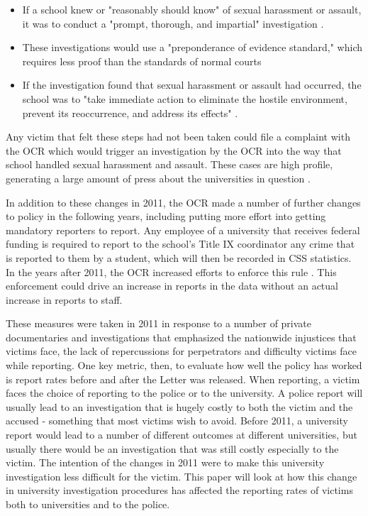 \documentclass[AER]{AEA}
\begin{document}
\begin{itemize}

\item If a school knew or "reasonably should know" of sexual harassment or assault, it was to conduct a "prompt, thorough, and impartial" investigation \cite{ali_dear_2011}.

\item These investigations would use a "preponderance of evidence standard," which requires less proof than the standards of normal courts \cite{lindo_any_2018}

\item If the investigation found that sexual harassment or assault had occurred, the school was to "take immediate action to eliminate the hostile environment, prevent its reoccurrence, and address its effects"  \cite{ali_dear_2011}. 

\end{itemize}

Any victim that felt these steps had not been taken could file a complaint with the OCR which would trigger an investigation by the OCR into the way that school handled sexual harassment and assault. These cases are high profile, generating a large amount of press about the universities in question \cite{lindo_any_2018}. 

In addition to these changes in 2011, the OCR made a number of further changes to policy in the following years, including putting more effort into getting mandatory reporters to report. Any employee of a university that receives federal funding is required to report to the school's Title IX coordinator any crime that is reported to them by a student, which will then be recorded in CSS statistics. In the years after 2011, the OCR increased efforts to enforce this rule . This enforcement could drive an increase in reports in the data without an actual increase in reports to staff.

These measures were taken in 2011 in response to a number of private documentaries and investigations that emphasized the nationwide injustices that victims face, the lack of repercussions for perpetrators and difficulty victims face while reporting. One key metric, then, to evaluate how well the policy has worked is report rates before and after the Letter was released. When reporting, a victim faces the choice of reporting to the police or to the university. A police report will usually lead to an investigation that is hugely costly to both the victim and the accused - something that most victims wish to avoid. Before 2011, a university report would lead to a number of different outcomes at different universities, but usually there would be an investigation that was still costly especially to the victim. The intention of the changes in 2011 were to make this university investigation less difficult for the victim. This paper will look at how this change in university investigation procedures has affected the reporting rates of victims both to universities and to the police.
\end{document}
